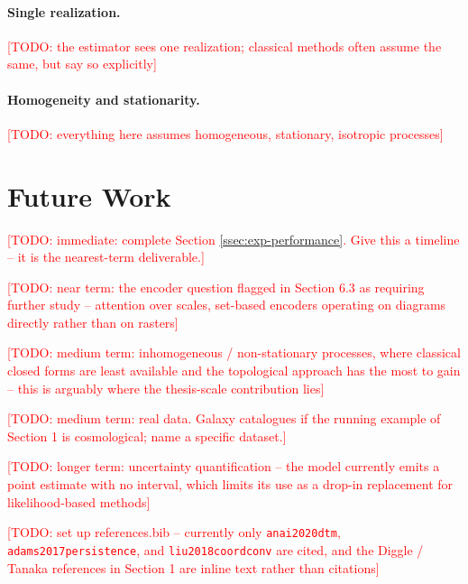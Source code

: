 \documentclass[11pt,letterpaper]{article}
\newcommand{\1}{\mathds{1}}
\newcommand{\todo}[1]{\textcolor{red}{[TODO: #1]}}
\newcommand{\todo}[1]{}
\theoremstyle{plain}
\theoremstyle{definitioncolon}
\begin{document}
\paragraph{Single realization.}
\todo{the estimator sees one realization; classical methods often assume the
same, but say so explicitly}

\paragraph{Homogeneity and stationarity.}
\todo{everything here assumes homogeneous, stationary, isotropic processes}


\section{Future Work}

\todo{immediate: complete Section \ref{ssec:exp-performance}. Give this a
timeline -- it is the nearest-term deliverable.}

\todo{near term: the encoder question flagged in Section 6.3 as requiring
further study -- attention over scales, set-based encoders operating on diagrams
directly rather than on rasters}

\todo{medium term: inhomogeneous / non-stationary processes, where classical
closed forms are least available and the topological approach has the most to
gain -- this is arguably where the thesis-scale contribution lies}

\todo{medium term: real data. Galaxy catalogues if the running example of
Section 1 is cosmological; name a specific dataset.}

\todo{longer term: uncertainty quantification -- the model currently emits a
point estimate with no interval, which limits its use as a drop-in replacement
for likelihood-based methods}


\todo{set up references.bib -- currently only \texttt{anai2020dtm},
\texttt{adams2017persistence}, and \texttt{liu2018coordconv} are cited, and the
Diggle / Tanaka references in Section 1 are inline text rather than citations}



\end{document}
